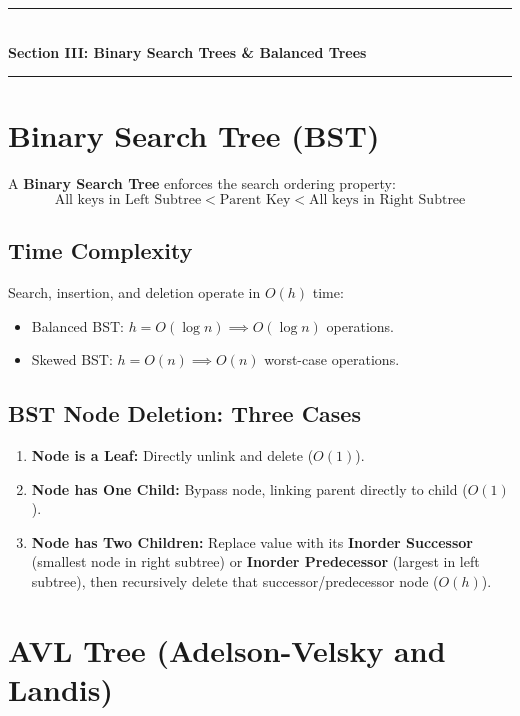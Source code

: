 \begin{center}
\vspace{1em}
{\color{primary}\rule{0.45\textwidth}{1.2pt}}\\[4pt]
{\Large\bfseries\color{primary} Section III: Binary Search Trees \& Balanced Trees}\\[2pt]
{\color{primary}\rule{0.45\textwidth}{1.2pt}}
\vspace{0.5em}
\end{center}

\section{Binary Search Tree (BST)}

A \textbf{Binary Search Tree} enforces the search ordering property:
\[
\text{All keys in Left Subtree} < \text{Parent Key} < \text{All keys in Right Subtree}
\]

\subsection{Time Complexity}
Search, insertion, and deletion operate in $O(h)$ time:
\begin{itemize}
    \item Balanced BST: $h = O(\log n) \implies O(\log n)$ operations.
    \item Skewed BST: $h = O(n) \implies O(n)$ worst-case operations.
\end{itemize}

\subsection{BST Node Deletion: Three Cases}
\begin{enumerate}
    \item \textbf{Node is a Leaf:} Directly unlink and delete ($O(1)$).
    \item \textbf{Node has One Child:} Bypass node, linking parent directly to child ($O(1)$).
    \item \textbf{Node has Two Children:} Replace value with its \textbf{Inorder Successor} (smallest node in right subtree) or \textbf{Inorder Predecessor} (largest in left subtree), then recursively delete that successor/predecessor node ($O(h)$).
\end{enumerate}

\section{AVL Tree (Adelson-Velsky and Landis)}

